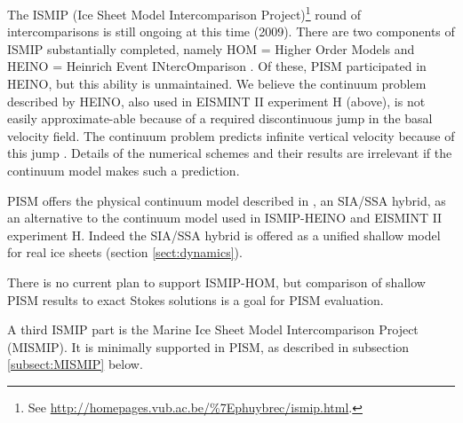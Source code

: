 \documentclass[11pt,final]{amsart}
\begin{document}
The ISMIP (Ice Sheet Model Intercomparison Project)\footnote{See \url{http://homepages.vub.ac.be/\%7Ephuybrec/ismip.html}.} round of intercomparisons is still ongoing at this time (2009).  There are two components of ISMIP substantially completed, namely HOM = Higher Order Models \cite{ISMIPHOM,HOMelmer} and HEINO = Heinrich Event INtercOmparison \cite{GreveTakahamaCalov,Calovetal2009HEINOfinal}.  Of these, PISM participated in HEINO, but this ability is unmaintained.   We believe the continuum problem described by HEINO, also used in EISMINT II experiment H (above), is not easily approximate-able because of a required discontinuous jump in the basal velocity field.  The continuum problem predicts infinite vertical velocity because of this jump \cite[Appendix B]{BBssasliding}.  Details of the numerical schemes and their results are irrelevant if the continuum model makes such a prediction.

PISM offers the physical continuum model described in \cite{BBssasliding}, an SIA/SSA hybrid, as an alternative to the continuum model used in ISMIP-HEINO and EISMINT II experiment H.  Indeed the SIA/SSA hybrid is offered as a unified shallow model for real ice sheets (section \ref{sect:dynamics}).

There is no current plan to support ISMIP-HOM, but comparison of shallow PISM results to exact Stokes solutions is a goal for PISM evaluation.

A third ISMIP part is the Marine Ice Sheet Model Intercomparison Project (MISMIP).  It is minimally supported in PISM, as described in subsection \ref{subsect:MISMIP} below.
\end{document}
